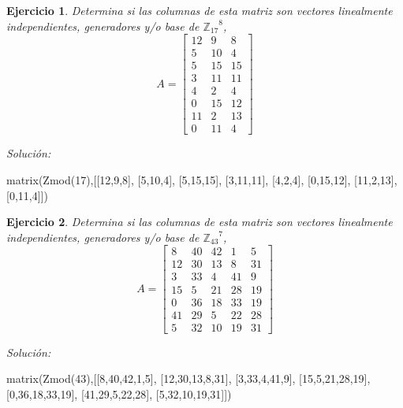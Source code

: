 \documentclass{amsart}
\newtheorem{ejer}{Ejercicio}
\begin{document}


\begin{ejer} Determina si las columnas de esta matriz son vectores linealmente independientes, generadores y/o base de ${{\mathbb Z}_{17}}^{8}$,
\[ A = \left[\begin{array}{rrr}
12 & 9 & 8 \\
5 & 10 & 4 \\
5 & 15 & 15 \\
3 & 11 & 11 \\
4 & 2 & 4 \\
0 & 15 & 12 \\
11 & 2 & 13 \\
0 & 11 & 4
\end{array}\right] \]
\end{ejer}

{\it Soluci\'on:}

\begin{sageblock}
matrix(Zmod(17),[[12,9,8],
[5,10,4],
[5,15,15],
[3,11,11],
[4,2,4],
[0,15,12],
[11,2,13],
[0,11,4]])
\end{sageblock}



\begin{ejer} Determina si las columnas de esta matriz son vectores linealmente independientes, generadores y/o base de ${{\mathbb Z}_{43}}^{7}$,
\[ A = \left[\begin{array}{rrrrr}
8 & 40 & 42 & 1 & 5 \\
12 & 30 & 13 & 8 & 31 \\
3 & 33 & 4 & 41 & 9 \\
15 & 5 & 21 & 28 & 19 \\
0 & 36 & 18 & 33 & 19 \\
41 & 29 & 5 & 22 & 28 \\
5 & 32 & 10 & 19 & 31
\end{array}\right] \]
\end{ejer}

{\it Soluci\'on:}

\begin{sageblock}
matrix(Zmod(43),[[8,40,42,1,5],
[12,30,13,8,31],
[3,33,4,41,9],
[15,5,21,28,19],
[0,36,18,33,19],
[41,29,5,22,28],
[5,32,10,19,31]])
\end{sageblock}

\end{document}
